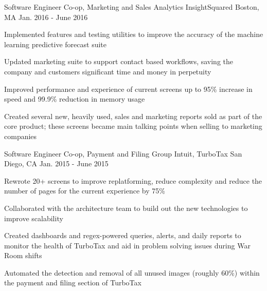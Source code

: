 

\begin{cventries}


  \cventry
    {Software Engineer Co-op, Marketing and Sales Analytics} %
    {InsightSquared} %
    {Boston, MA} %
    {Jan. 2016 - June 2016} %
    {
      \begin{cvitems} %
        \item {Implemented features and testing utilities to improve the accuracy of the machine learning predictive forecast suite}
        \item {Updated marketing suite to support contact based workflows, saving the company and customers significant time and money in perpetuity}
        \item {Improved performance and experience of current screens up to 95\% increase in speed and 99.9\% reduction in memory usage}
        \item {Created several new, heavily used, sales and marketing reports sold as part of the core product; these screens became main talking points when selling to marketing companies}
      \end{cvitems}
    }

  \cventry
    {Software Engineer Co-op, Payment and Filing Group} %
    {Intuit, TurboTax} %
    {San Diego, CA} %
    {Jan. 2015 - June 2015} %
    {
      \begin{cvitems} %
        \item {Rewrote 20+ screens to improve replatforming, reduce complexity and reduce the number of pages for the current experience by 75\%}
        \item {Collaborated with the architecture team to build out the new technologies to improve scalability}
        \item {Created dashboards and regex-powered queries, alerts, and daily reports to monitor the health of TurboTax and aid in problem solving issues during War Room shifts}
        \item {Automated the detection and removal of all unused images (roughly 60\%) within the payment and filing section of TurboTax}
      \end{cvitems}
    }


\end{cventries}
